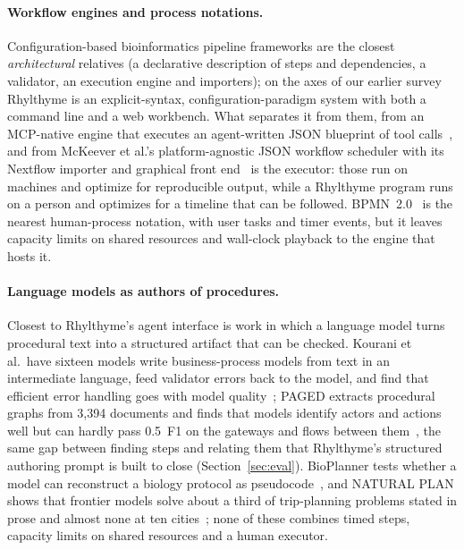 \documentclass[10pt]{article}
\newcommand{\rt}{Rhylthyme}
\begin{document}
\paragraph{Workflow engines and process notations.} Configuration-based bioinformatics pipeline frameworks are the closest \emph{architectural} relatives (a declarative description of steps and dependencies, a validator, an execution engine and importers); on the axes of our earlier survey~\cite{leipzig2017pipelines} \rt{} is an explicit-syntax, configuration-paradigm system with both a command line and a web workbench. What separates it from them, from an MCP-native engine that executes an agent-written JSON blueprint of tool calls~\cite{parmar2026mcpworkflow}, and from McKeever et al.'s platform-agnostic JSON workflow scheduler with its Nextflow importer and graphical front end~\cite{mckeever2025scheduler} is the executor: those run on machines and optimize for reproducible output, while a \rt{} program runs on a person and optimizes for a timeline that can be followed. BPMN~2.0~\cite{omg2011bpmn} is the nearest human-process notation, with user tasks and timer events, but it leaves capacity limits on shared resources and wall-clock playback to the engine that hosts it.

\paragraph{Language models as authors of procedures.} Closest to \rt{}'s agent interface is work in which a language model turns procedural text into a structured artifact that can be checked. Kourani et al.\ have sixteen models write business-process models from text in an intermediate language, feed validator errors back to the model, and find that efficient error handling goes with model quality~\cite{kourani2026bpm}; PAGED extracts procedural graphs from 3,394 documents and finds that models identify actors and actions well but can hardly pass 0.5~F1 on the gateways and flows between them~\cite{du2024paged}, the same gap between finding steps and relating them that \rt{}'s structured authoring prompt is built to close (Section~\ref{sec:eval}). BioPlanner tests whether a model can reconstruct a biology protocol as pseudocode~\cite{odonoghue2023bioplanner}, and NATURAL PLAN shows that frontier models solve about a third of trip-planning problems stated in prose and almost none at ten cities~\cite{zheng2024naturalplan}; none of these combines timed steps, capacity limits on shared resources and a human executor.
\end{document}
